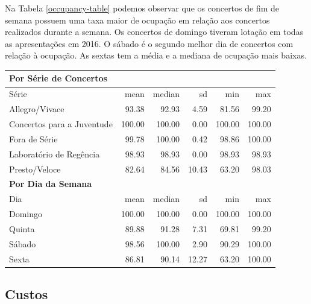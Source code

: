 \documentclass[a4paper, 12pt, openright, oneside, german, french, english, brazil]{abntex2}
\begin{document}
	
	Na Tabela \ref{occupancy-table} podemos observar que os concertos de fim de semana possuem uma taxa maior de ocupação em relação aos concertos realizados durante a semana. Os concertos de domingo tiveram lotação em todas as apresentações em 2016. O sábado é o segundo melhor dia de concertos com relação à ocupação. As sextas tem a média e a mediana de ocupação mais baixas.
	
	\begin{table}[!h]
		{\begin{tabular}{lrrrrr}
				\hline
				\multicolumn{6}{l}{\textbf{Por Série de Concertos}} \\
				\hline
				Série & mean & median & sd & min & max \\ 
				\hline
				Allegro/Vivace & 93.38 & 92.93 & 4.59 & 81.56 & 99.20 \\ 
				Concertos para a Juventude & 100.00 & 100.00 & 0.00 & 100.00 & 100.00 \\ 
				Fora de Série & 99.78 & 100.00 & 0.42 & 98.86 & 100.00 \\
				Laboratório de Regência & 98.93 & 98.93 & 0.00 & 98.93 & 98.93 \\ 
				Presto/Veloce & 82.64 & 84.56 & 10.43 & 63.20 & 98.03 \\ 
				\hline
				\multicolumn{6}{l}{\textbf{Por Dia da Semana}} \\
				\hline
				Dia  & mean & median & sd & min & max \\
				\hline
				Domingo  & 100.00 & 100.00 & 0.00 & 100.00 & 100.00 \\ 
				Quinta & 89.88 & 91.28 & 7.31 & 69.81 & 99.20 \\ 
				Sábado & 98.56 & 100.00 & 2.90 & 90.29 & 100.00 \\  
				Sexta & 86.81 & 90.14 & 12.27 & 63.20 & 100.00 \\ 
				\hline
			\end{tabular}
		}
		{}
	\end{table}
	
	
	
	\subsection{Custos}
	
\end{document}
